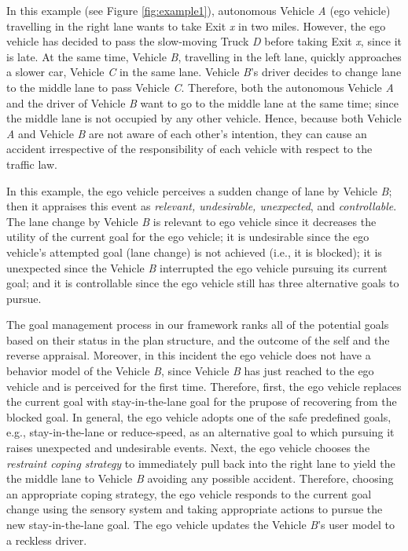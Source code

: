 \documentclass[journal, 11pt]{IEEEtran}
\begin{document}
In this example (see Figure \ref{fig:example1}), autonomous Vehicle
\textit{A} (ego vehicle) travelling in the right lane wants to take Exit
\textit{x} in two miles. However, the ego vehicle has decided to pass the
slow-moving Truck \textit{D} before taking Exit \textit{x}, since it is late. At
the same time, Vehicle \textit{B}, travelling in the left lane, quickly
approaches a slower car, Vehicle \textit{C} in the same lane. Vehicle
\textit{B}'s driver decides to change lane to the middle lane to pass Vehicle
\textit{C}. Therefore, both the autonomous Vehicle \textit{A} and the driver of
Vehicle \textit{B} want to go to the middle lane at the same time; since the
middle lane is not occupied by any other vehicle. Hence, because both Vehicle
\textit{A} and Vehicle \textit{B} are not aware of each other's intention, they
can cause an accident irrespective of the responsibility of each vehicle with
respect to the traffic law.

In this example, the ego vehicle perceives a sudden change of lane by Vehicle
\textit{B}; then it appraises this event as \textit{relevant, undesirable,
unexpected}, and \textit{controllable}. The lane change by Vehicle \textit{B} is
relevant to ego vehicle since it decreases the utility of the current goal for
the ego vehicle; it is undesirable since the ego vehicle's attempted goal (lane
change) is not achieved (i.e., it is blocked); it is unexpected since the
Vehicle \textit{B} interrupted the ego vehicle pursuing its current goal; and it
is controllable since the ego vehicle still has three alternative goals to
pursue. 

The goal management process in our framework ranks all of the potential goals
based on their status in the plan structure, and the outcome of the self and the
reverse appraisal. Moreover, in this incident the ego vehicle does not have a
behavior model of the Vehicle \textit{B}, since Vehicle \textit{B} has just
reached to the ego vehicle and is perceived for the first time. Therefore,
first, the ego vehicle replaces the current goal with stay-in-the-lane goal for
the prupose of recovering from the blocked goal. In general, the ego vehicle
adopts one of the safe predefined goals, e.g., stay-in-the-lane or reduce-speed,
as an alternative goal to which pursuing it raises unexpected and undesirable
events. Next, the ego vehicle chooses the \textit{restraint coping strategy} to
immediately pull back into the right lane to yield the the middle lane to
Vehicle \textit{B} avoiding any possible accident. Therefore, choosing an
appropriate coping strategy, the ego vehicle responds to the current goal change
using the sensory system and taking appropriate actions to pursue the new
stay-in-the-lane goal. The ego vehicle updates the Vehicle \textit{B}'s user
model to a reckless driver.\\
\end{document}
